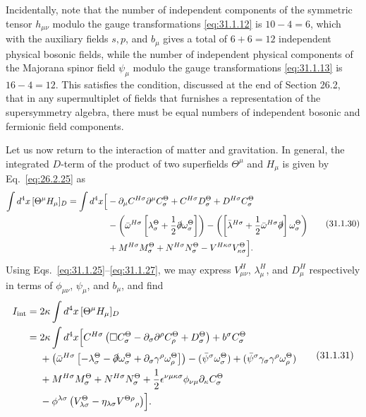 Incidentally, note that the number of independent components of the symmetric
tensor \(h_{\mu\nu}\) modulo the gauge transformations \eqref{eq:31.1.12} is
\(10-4=6\), which with the auxiliary fields \(s,p\), and \(b_\mu\) gives a
total of \(6+6=12\) independent physical bosonic fields, while the number of
independent physical components of the Majorana spinor field \(\psi_\mu\)
modulo the gauge transformations \eqref{eq:31.1.13} is \(16-4=12\). This
satisfies the condition, discussed at the end of Section 26.2, that in any
supermultiplet of fields that furnishes a representation of the supersymmetry
algebra, there must be equal numbers of independent bosonic and fermionic
field components.

Let us now return to the interaction of matter and gravitation. In general,
the integrated \(D\)-term of the product of two superfields \(\Theta^\mu\)
and \(H_\mu\) is given by Eq.~\eqref{eq:26.2.25} as
\begin{equation}
  \begin{aligned}
  \int d^4x\,[\Theta^\mu H_\mu]_D
  =\int d^4x\Bigl[&
    -\partial_\mu C^{H\sigma}\partial^\mu C_\sigma^\Theta
    +C^{H\sigma}D_\sigma^\Theta
    +D^{H\sigma}C_\sigma^\Theta
  \\
  &-\left(\bar\omega^{H\sigma}
    \left[\lambda_\sigma^\Theta
      +\frac12\sl{\partial}\omega_\sigma^\Theta\right]\right)
    -\left(
      \left[\bar\lambda^{H\sigma}
        +\frac12\bar\omega^{H\sigma}\sl{\partial}\right]
      \omega_\sigma^\Theta
    \right)
  \\
  &+M^{H\sigma}M_\sigma^\Theta
    +N^{H\sigma}N_\sigma^\Theta
    -V^{H\kappa\sigma}V_{\kappa\sigma}^\Theta
  \Bigr].
  \end{aligned}
  \tag{31.1.30}\label{eq:31.1.30}
\end{equation}
Using Eqs.~\eqref{eq:31.1.25}--\eqref{eq:31.1.27}, we may express
\(V_{\mu\nu}^H\), \(\lambda_\mu^H\), and \(D_\mu^H\) respectively in terms
of \(\phi_{\mu\nu}\), \(\psi_\mu\), and \(b_\mu\), and find
\begin{equation}
  \begin{aligned}
  I_{\mathrm{int}}
  ={}&2\kappa\int d^4x\,[\Theta^\mu H_\mu]_D
  \\
  ={}&2\kappa\int d^4x\Bigl[
    C^{H\sigma}\left(
      \Box C_\sigma^\Theta
      -\partial_\sigma\partial^\rho C_\rho^\Theta
      +D_\sigma^\Theta
    \right)
    +b^\sigma C_\sigma^\Theta
  \\
  &+\left(\bar\omega^{H\sigma}
    \left[
      -\lambda_\sigma^\Theta
      -\sl{\partial}\omega_\sigma^\Theta
      +\partial_\sigma\gamma^\rho\omega_\rho^\Theta
    \right]\right)
    -(\bar\psi^\sigma\omega_\sigma^\Theta)
    +(\bar\psi^\sigma\gamma_\sigma\gamma^\rho\omega_\rho^\Theta)
  \\
  &+M^{H\sigma}M_\sigma^\Theta
    +N^{H\sigma}N_\sigma^\Theta
    +\frac12\epsilon^{\nu\mu\kappa\sigma}
      \phi_{\nu\mu}\partial_\kappa C_\sigma^\Theta
  \\
  &-\phi^{\lambda\sigma}
    \left(
      V_{\lambda\sigma}^\Theta
      -\eta_{\lambda\sigma}V^{\Theta\rho}{}_\rho
    \right)
  \Bigr].
  \end{aligned}
  \tag{31.1.31}\label{eq:31.1.31}
\end{equation}
